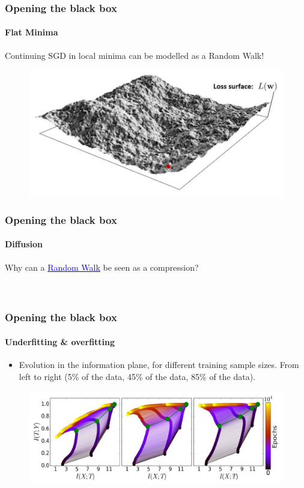 \documentclass[10pt]{beamer}
\begin{document}
\begin{frame}
\frametitle{Opening the black box}
\framesubtitle{Flat Minima}
Continuing SGD in local minima can be modelled as a Random Walk!
\begin{figure}
\vspace*{4mm}
\centering
\includegraphics[scale=0.35]{figs/flat-loss.jpeg}
\end{figure}
\end{frame}

\begin{frame}
\frametitle{Opening the black box}
\framesubtitle{Diffusion}
Why can a \href{https://www.wolframalpha.com/input/?i=randomwalk}{\textcolor{blue}{Random Walk}} be seen as a compression?\\[0.35cm]
\\[0.2cm]
\\[0.2cm]
\end{frame}

\begin{frame}
\frametitle{Opening the black box}
\framesubtitle{Underfitting \& overfitting}
\begin{itemize}
\item Evolution in the information plane, for different training sample sizes. From left to right (5\% of the data, 45\% of the data, 85\% of the data).
\end{itemize}
\begin{figure}
\centering
\includegraphics[scale=0.3]{figs/overfitting.jpeg}
\end{figure}
\end{frame}
\end{document}
